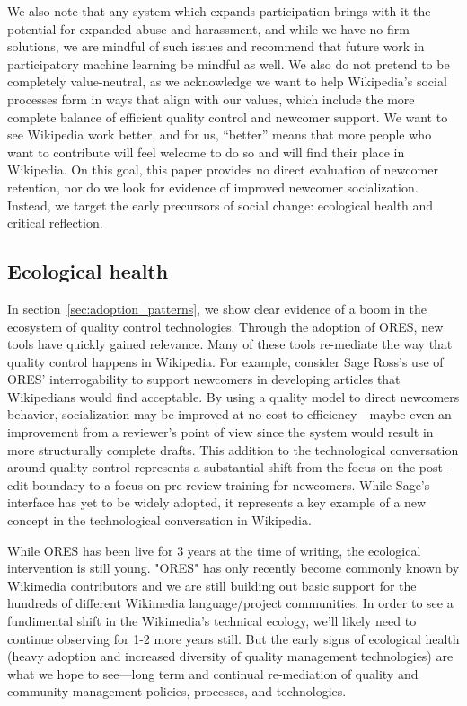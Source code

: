 We also note that any system which expands participation brings with it the potential for expanded abuse and harassment, and while we have no firm solutions, we are mindful of such issues and recommend that future work in participatory machine learning be mindful as well. We also do not pretend to be completely value-neutral, as we acknowledge we want to help Wikipedia's social processes form in ways that align with our values, which include the more complete balance of efficient quality control and newcomer support. We want to see Wikipedia work better, and for us, ``better'' means that more people who want to contribute will feel welcome to do so and will find their place in Wikipedia. On this goal, this paper provides no direct evaluation of newcomer retention, nor do we look for evidence of improved newcomer socialization. Instead, we target the early precursors of social change: ecological health and critical reflection.

\subsection{Ecological health}
In section~\ref{sec:adoption_patterns}, we show clear evidence of a boom in the ecosystem of quality control technologies.  Through the adoption of ORES, new tools have quickly gained relevance.  Many of these tools re-mediate the way that quality control happens in Wikipedia.  For example, consider Sage Ross's use of ORES' interrogability to support newcomers in developing articles that Wikipedians would find acceptable.  By using a quality model to direct newcomers behavior, socialization may be improved at no cost to efficiency---maybe even an improvement from a reviewer's point of view since the system would result in more structurally complete drafts.  This addition to the technological conversation around quality control represents a substantial shift from the focus on the post-edit boundary\cite{geiger2012defense} to a focus on pre-review training for newcomers.  While Sage's interface has yet to be widely adopted, it represents a key example of a new concept in the technological conversation in Wikipedia.

While ORES has been live for 3 years at the time of writing, the ecological intervention is still young.  "ORES" has only recently become commonly known by Wikimedia contributors and we are still building out basic support for the hundreds of different Wikimedia language/project communities.  In order to see a fundimental shift in the Wikimedia's technical ecology, we'll likely need to continue observing for 1-2 more years still.  But the early signs of ecological health (heavy adoption and increased diversity of quality management technologies) are what we hope to see---long term and continual re-mediation of quality and community management policies, processes, and technologies.

